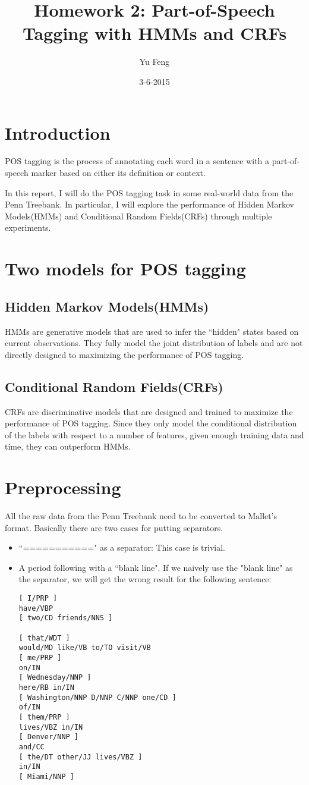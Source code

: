 \documentclass[10pt]{article}
\title{Homework 2: Part-of-Speech Tagging with HMMs and CRFs}
\author{Yu Feng}
\date{3-6-2015}
\begin{document}
\maketitle

\section{Introduction}
POS tagging is the process of annotating each word in a sentence with a part-of-speech marker based on either its definition or context.

In this report, I will do the POS tagging task in some real-world data from the Penn Treebank. In particular, I will explore the performance of Hidden Markov Models(HMMs) and Conditional Random Fields(CRFs) through multiple experiments.
 
\section{Two models for POS tagging}\label{sec:alg}

\subsection{Hidden Markov Models(HMMs)}
HMMs are generative models that are used to infer the ``hidden" states based on current observations. They fully model the joint distribution of labels and are not directly designed to maximizing the performance of POS tagging.


\subsection{Conditional Random Fields(CRFs)}
CRFs are discriminative models that are designed and trained to maximize the performance of POS tagging. Since they only model the conditional distribution of the labels with respect to a number of features, given enough training data and time, they can outperform HMMs. 

\section{Preprocessing}
All the raw data from the Penn Treebank need to be converted to Mallet's format. Basically there are two cases for putting separators.
\begin{itemize}
  \item ``===========" as a separator: This case is trivial.
  \item A period following with a ``blank line". If we naively use the "blank line" as the separator, we will get the wrong result for the following sentence:

\small
\begin{verbatim}
[ I/PRP ]
have/VBP 
[ two/CD friends/NNS ]

[ that/WDT ]
would/MD like/VB to/TO visit/VB 
[ me/PRP ]
on/IN 
[ Wednesday/NNP ]
here/RB in/IN 
[ Washington/NNP D/NNP C/NNP one/CD ]
of/IN 
[ them/PRP ]
lives/VBZ in/IN 
[ Denver/NNP ]
and/CC 
[ the/DT other/JJ lives/VBZ ]
in/IN 
[ Miami/NNP ]
\end{verbatim}
\end{itemize}
\end{document}
